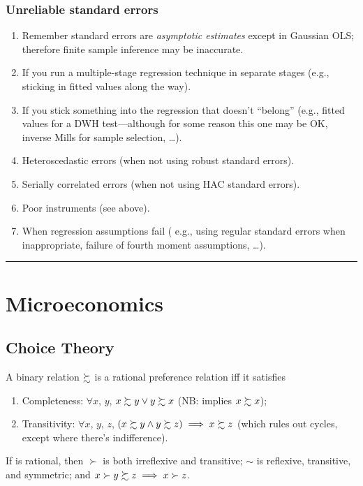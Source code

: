 \documentclass[8pt,letterpaper, landscape]{extarticle} %
\begin{document}
\begin{multicols}{3}
\begin{description}
\subsubsection*{Unreliable standard errors}
\begin{enumerate}
\item Remember standard errors are \textit{asymptotic estimates} except in Gaussian OLS; therefore finite sample inference may be inaccurate.
\item If you run a multiple-stage regression technique in separate stages (e.g., sticking in fitted values along the way).
\item If you stick something into the regression that doesn't ``belong'' (e.g., fitted values for a DWH test---although for some reason this one may be OK, inverse Mills for sample selection, \ldots).
\item Heteroscedastic errors (when not using robust standard errors).
\item Serially correlated errors (when not using HAC standard errors).
\item Poor instruments (see above).
\item When regression assumptions fail ( e.g., using regular standard errors when inappropriate, failure of fourth moment assumptions, \ldots).
\end{enumerate}

\hrule
\section{Microeconomics}
\subsection{Choice Theory}
 A binary relation $ \succsim $ is a rational preference relation iff it satisfies
\begin{enumerate}
\item Completeness: $ \forall x $, $ y $, $ x \succsim y \vee y \succsim x $ (NB: implies $ x \succsim x $);
\item Transitivity: $ \forall x $, $ y $, $ z $, $ (x \succsim y \wedge y \succsim z) \implies x \succsim z $ (which rules out cycles, except where there's indifference).
\end{enumerate}
If \pref{} is rational, then $ \succ $ is both irreflexive and transitive; $ \sim $ is reflexive, transitive, and symmetric; and $ x \succ y \succsim z \implies x \succ z $.


\end{description}
\end{multicols}
\end{document}
